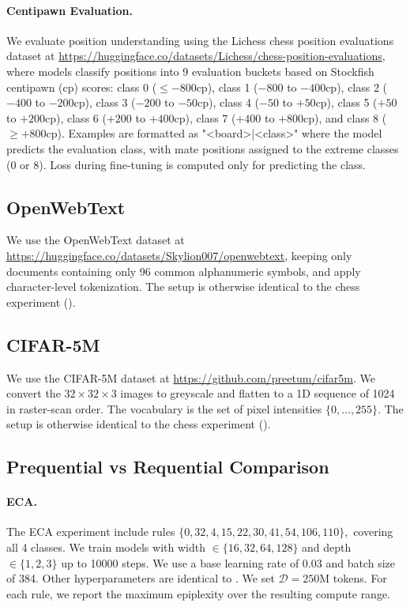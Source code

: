 \documentclass[twoside]{article}
\newcommand{\D}{\mathcal{D}}
\begin{document}
\paragraph{Centipawn Evaluation.} We evaluate position understanding using the Lichess chess position evaluations dataset at \url{https://huggingface.co/datasets/Lichess/chess-position-evaluations}, where models classify positions into 9 evaluation buckets based on Stockfish centipawn (cp) scores: class 0 ($\leq -800$cp), class 1 ($-800$ to $-400$cp), class 2 ($-400$ to $-200$cp), class 3 ($-200$ to $-50$cp), class 4 ($-50$ to $+50$cp), class 5 ($+50$ to $+200$cp), class 6 ($+200$ to $+400$cp), class 7 ($+400$ to $+800$cp), and class 8 ($\geq +800$cp). Examples are formatted as "<board>|<class>" where the model predicts the evaluation class, with mate positions assigned to the extreme classes (0 or 8). Loss during fine-tuning is computed only for predicting the class.

%
%
%
%
%
%
%
%
%
%
%
%
%
%
%
%
%
%
%
%
%
%

%
%
%
%
%
%
%
%
%

\subsection{OpenWebText}\label{app:owt}
We use the OpenWebText dataset at \url{https://huggingface.co/datasets/Skylion007/openwebtext}, keeping only documents containing only 96 common alphanumeric symbols, and apply character-level tokenization. The setup is otherwise identical to the chess experiment ().

\subsection{CIFAR-5M}\label{app:c5m}
We use the CIFAR-5M dataset at \url{https://github.com/preetum/cifar5m}. We convert the $32 \times 32 \times 3$ images to greyscale and flatten to a 1D sequence of 1024 in raster-scan order. The vocabulary is the set of pixel intensities $\{0,\ldots,255\}$. The setup is otherwise identical to the chess experiment ().

\subsection{Prequential vs Requential Comparison} \label{app:preq-vs-req}
\paragraph{ECA.} The ECA experiment include rules $\{0, 32, 4, 15, 22, 30, 41, 54, 106, 110\},$ covering all 4 classes. We train models with width $\in \{16,32,64,128\}$ and depth $\in \{1,2,3\}$ up to 10000 steps. We use a base learning rate of 0.03 and batch size of 384. Other hyperparameters are identical to . We set $\D=250$M tokens. For each rule, we report the maximum epiplexity over the resulting compute range.
\end{document}
